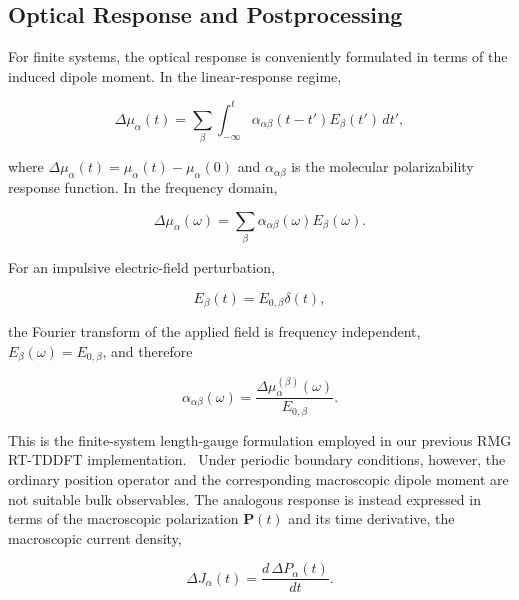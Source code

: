 \subsection{Optical Response and Postprocessing}
\label{sec:optical-response}
For finite systems, the optical response is conveniently formulated in
terms of the induced dipole moment.  In the linear-response regime,

\begin{equation}
\Delta \mu_{\alpha}(t)
=
\sum_{\beta}
\int_{-\infty}^{t}
\alpha_{\alpha\beta}(t-t')
E_{\beta}(t')\,dt',
\label{eq:dipole_linear_response}
\end{equation}

where
$\Delta\mu_{\alpha}(t)=\mu_{\alpha}(t)-\mu_{\alpha}(0)$
and $\alpha_{\alpha\beta}$ is the molecular polarizability response
function.  In the frequency domain,

\begin{equation}
\Delta\mu_{\alpha}(\omega)
=
\sum_{\beta}
\alpha_{\alpha\beta}(\omega)
E_{\beta}(\omega).
\label{eq:dipole_response_frequency}
\end{equation}

For an impulsive electric-field perturbation,

\begin{equation}
E_{\beta}(t)=E_{0,\beta}\delta(t),
\label{eq:finite_delta_kick}
\end{equation}

the Fourier transform of the applied field is frequency independent,
$E_{\beta}(\omega)=E_{0,\beta}$, and therefore

\begin{equation}
\alpha_{\alpha\beta}(\omega)
=
\frac{\Delta\mu_{\alpha}^{(\beta)}(\omega)}
     {E_{0,\beta}}.
\label{eq:polarizability_from_dipole}
\end{equation}

This is the finite-system length-gauge formulation employed in our
previous RMG RT-TDDFT implementation.~\cite{...}
Under periodic boundary conditions, however, the ordinary position
operator and the corresponding macroscopic dipole moment are not
suitable bulk observables.  The analogous response is instead expressed
in terms of the macroscopic polarization $\mathbf{P}(t)$ and its time
derivative, the macroscopic current density,

\begin{equation}
\Delta J_{\alpha}(t)
=
\frac{d\,\Delta P_{\alpha}(t)}{dt}.
\label{eq:current_polarization_relation}
\end{equation}

